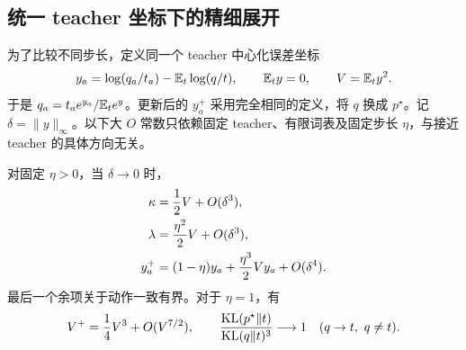 \subsection{统一 teacher 坐标下的精细展开}
\label{dyn:sec:mean-hard-sync-local-expansion}

为了比较不同步长，定义同一个 teacher 中心化误差坐标
\begin{equation}
 y_a=\log(q_a/t_a)-\mathbb E_t\log(q/t),
 \qquad \mathbb E_ty=0,\qquad V=\mathbb E_ty^2.
 \label{dyn:eq:mean-hard-sync-centered-coordinate}
\end{equation}
于是 $q_a=t_ae^{y_a}/\mathbb E_te^y$。更新后的 $y_a^+$ 采用完全相同的定义，将 $q$ 换成 $p^\star$。记 $\delta=\|y\|_\infty$。以下大 $O$ 常数只依赖固定 teacher、有限词表及固定步长 $\eta$，与接近 teacher 的具体方向无关。

\begin{theorem}
\label{dyn:thm:mean-hard-sync-local-expansion}
对固定 $\eta>0$，当 $\delta\to0$ 时，
\begin{align}
 \kappa&=\frac12V+O(\delta^3),\notag\\
 \lambda&=\frac{\eta^2}{2}V+O(\delta^3),\notag\\
 y_a^+&=(1-\eta)y_a+\frac{\eta^3}{2}Vy_a+O(\delta^4).
 \label{dyn:eq:mean-hard-sync-local-expansion}
\end{align}
最后一个余项关于动作一致有界。对于 $\eta=1$，有
\begin{equation}
 V^+=\frac14V^3+O(V^{7/2}),
 \qquad
 \frac{\operatorname{KL}(p^\star\Vert t)}{\operatorname{KL}(q\Vert t)^3}\longrightarrow1
 \quad(q\to t,\ q\ne t).
 \label{dyn:eq:mean-hard-sync-kl-cubic}
\end{equation}
\end{theorem}

